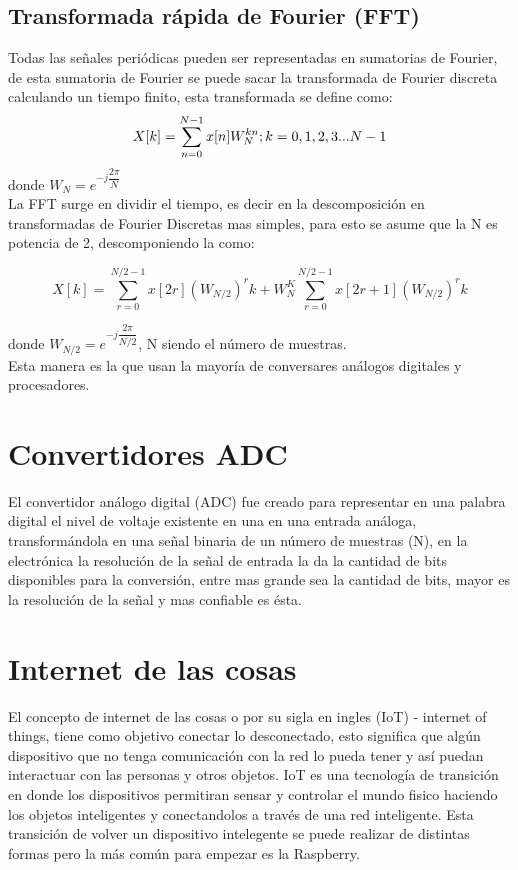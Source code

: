 \subsection{Transformada rápida de Fourier (FFT) }
Todas las señales periódicas pueden ser representadas en sumatorias de Fourier, de esta sumatoria de Fourier se puede sacar la transformada de Fourier discreta calculando un tiempo finito, esta transformada se define como:
\begin{equation}
X[k]=\sum_{n=0}^{N-1}x[n]W_{N}^{kn} ; \\   k = 0,1,2,3...N-1
\end{equation}
donde $W_{N}=e^{-j\dfrac{2\pi}{N}}$\\
La FFT surge en dividir el tiempo, es decir en la descomposición en transformadas de Fourier Discretas mas simples, para esto se asume que la N es potencia de 2, descomponiendo la como: 

\begin{equation}
X[k]=\sum_{r=0}^{N/2-1}x[2r](W_{N/2})^rk + W_{N}^K \sum_{r=0}^{N/2-1}x[2r+1](W_{N/2})^rk
\end{equation}

donde $W_{N/2}=e^{-j\dfrac{2\pi}{N/2}}$, N siendo el número de muestras. \cite{A36}\\

Esta manera es la que usan la mayoría de conversares análogos digitales y procesadores. 


\section{Convertidores ADC}
El convertidor análogo digital (ADC) fue creado para representar en una palabra digital el nivel de voltaje existente en una en una entrada análoga, transformándola en una señal binaria de un número de muestras (N), en la electrónica la resolución de la señal de entrada la da la cantidad de bits disponibles para la conversión, entre mas grande sea la cantidad de bits, mayor es la resolución de la señal y mas confiable es ésta. 

\section{Internet de las cosas}

El concepto de internet de las cosas o por su sigla en ingles (IoT) - internet of things, tiene como objetivo conectar lo desconectado, esto significa que algún dispositivo que no tenga comunicación con la red lo pueda tener y así puedan interactuar con las personas y otros objetos. IoT es una tecnología de transición en donde los dispositivos permitiran sensar y controlar el mundo fisico haciendo los objetos inteligentes y conectandolos a través de una red inteligente. Esta transición de volver un dispositivo intelegente se puede realizar de distintas formas pero la más común para empezar es la Raspberry. \cite{A38}

